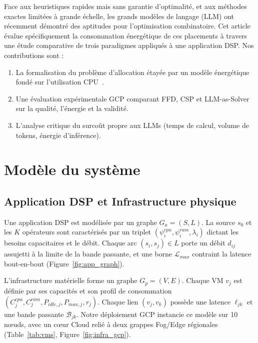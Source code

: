 ﻿\documentclass[systeme]{compas2026}
\begin{document}
Face aux heuristiques rapides mais sans garantie d'optimalité, et aux méthodes exactes limitées à grande échelle, les grands modèles de langage (LLM) ont récemment démontré des aptitudes pour l'optimisation combinatoire. Cet article évalue spécifiquement la consommation énergétique de ces placements à travers une étude comparative de trois paradigmes appliqués à une application DSP. Nos contributions sont :
\begin{enumerate}[leftmargin=*, nosep]
    \item La formalisation du problème d'allocation étayée par un modèle énergétique fondé sur l'utilisation CPU~\cite{beloglazov2012energy}.
    \item Une évaluation expérimentale GCP comparant FFD, CSP et LLM-as-Solver sur la qualité, l'énergie et la validité.
    \item L'analyse critique du surcoût propre aux LLMs (temps de calcul, volume de tokens, énergie d'inférence).
\end{enumerate}

\section{Modèle du système}
\label{sec:model}

\subsection{Application DSP et Infrastructure physique}

Une application DSP est modélisée par un graphe $G_a = (S, L)$. La source $s_0$ et les $K$ opérateurs sont caractérisés par un triplet $(\psi_i^{cpu}, \psi_i^{ram}, \lambda_i)$ dictant les besoins capacitaires et le débit. Chaque arc $(s_i, s_j) \in L$ porte un débit $d_{ij}$ assujetti à la limite de la bande passante, et une borne $\mathcal{L}_{max}$ contraint la latence bout-en-bout (Figure~\ref{fig:app_graph}).

L'infrastructure matérielle forme un graphe $G_p = (V, E)$. Chaque VM $v_j$ est définie par ses capacités et son profil de consommation $(C_j^{cpu}, C_j^{ram}, P_{idle,j}, P_{max,j}, r_j)$. Chaque lien $(v_j,v_k)$ possède une latence $\ell_{jk}$ et une bande passante $\mathcal{B}_{jk}$. Notre déploiement GCP instancie ce modèle sur 10 nœuds, avec un cœur Cloud relié à deux grappes Fog/Edge régionales (Table~\ref{tab:vms}, Figure~\ref{fig:infra_gcp}).
\end{document}
